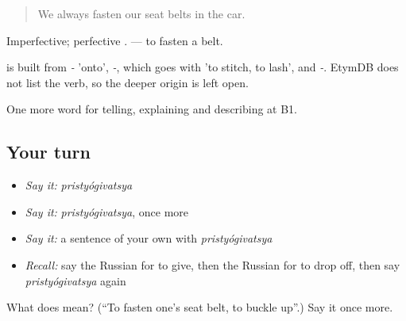 \begin{quote}
We always fasten our seat belts in the car.
\end{quote}

Imperfective; perfective \emph{}. \emph{ } — to fasten a belt.

\begin{cousinweb}
\emph{} is built from \emph{-} 'onto', \emph{-}, which goes with \emph{} 'to stitch, to lash', and \emph{-}. EtymDB does not list the verb, so the deeper origin is left open.
\end{cousinweb}

\begin{grammarlens}[title={What you've built}]
One more word for telling, explaining and describing at B1.
\end{grammarlens}

\subsection*{Your turn}
\begin{itemize}
\raggedright
  \item \emph{Say it:} \emph{pristyógivatsya}
  \item \emph{Say it:} \emph{pristyógivatsya}, once more
  \item \emph{Say it:} a sentence of your own with \emph{pristyógivatsya}
  \item \emph{Recall:} say the Russian for to give, then the Russian for to drop off, then say \emph{pristyógivatsya} again
\end{itemize}

\begin{tcolorbox}[breakable,colback=teal!4,colframe=teal!35!black,title={Before you move on}]
What does  mean? (\textquotedblleft{}To fasten one's seat belt, to buckle up\textquotedblright{}.) Say it once more.
\end{tcolorbox}
